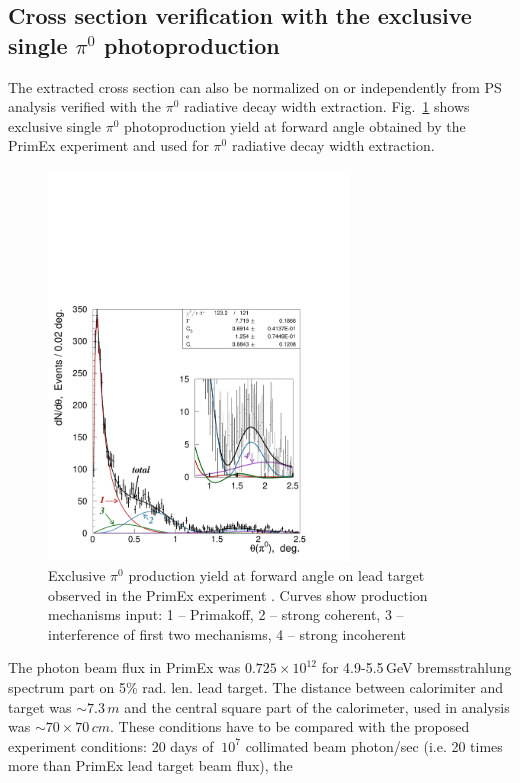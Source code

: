 \subsection{Cross section verification with the exclusive single $\pi^0$ photoproduction}
The extracted cross section can also be normalized on or independently
from PS analysis verified with the $\pi^0$ radiative decay width
extraction.  Fig.~\ref{fig:leaddndt} shows exclusive single $\pi^0$
photoproduction yield at forward angle obtained by the PrimEx
experiment and used for $\pi^0$ radiative decay width extraction.
\begin{figure}[tpb]
\begin{center}
\includegraphics[width=8cm,angle=0,trim={1.5cm 0.5cm 3.5cm 9.5cm},clip]{figures/dndt_pb_partial.pdf}
\end{center}
\caption{Exclusive $\pi^0$ production yield at forward angle on lead target
observed in the PrimEx experiment \cite{Larin:2010kq}. Curves show production mechanisms input:
1 -- Primakoff, 2 -- strong coherent, 3 -- interference of first two mechanisms, 4 -- strong incoherent}
\label{fig:leaddndt}
\end{figure}
The photon beam flux in PrimEx was $0.725\times10^{12}$ for
4.9-5.5$\,$GeV bremsstrahlung spectrum part on 5\% rad. len. lead
target. The distance between calorimiter and target was $\sim7.3\,m$
and the central square part of the calorimeter, used in analysis was
$\sim70\times70\,cm$. These conditions have to be compared with the
proposed experiment conditions: 20 days of $~10^7$ collimated beam
photon/sec (i.e. 20 times more than PrimEx lead target beam flux), the
